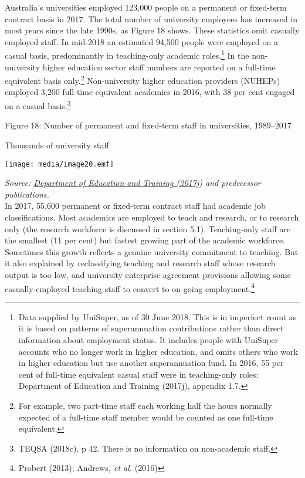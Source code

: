 \documentclass[]{book}
\begin{document}
Australia's universities employed 123,000 people on a permanent or fixed-term contract basis in 2017. The total number of university employees has increased in most years since the late 1990s, as Figure 18 shows. These statistics omit casually employed staff. In mid-2018 an estimated 94,500 people were employed on a casual basis, predominantly in teaching-only academic roles.\footnote{Data supplied by UniSuper, as of 30 June 2018. This is in imperfect count as it is based on patterns of superannuation contributions rather than direct information about employment status. It includes people with UniSuper accounts who no longer work in higher education, and omits others who work in higher education but use another superannuation fund. In 2016, 55 per cent of full-time equivalent casual staff were in teaching-only roles: Department of Education and Training (2017j), appendix 1.7.} In the non-university higher education sector staff numbers are reported on a full-time equivalent basis only.\footnote{For example, two part-time staff each working half the hours normally expected of a full-time staff member would be counted as one full-time equivalent.} Non-university higher education providers (NUHEPs) employed 3,200 full-time equivalent academics in 2016, with 38 per cent engaged on a casual basis.\footnote{TEQSA (2018c), p 42. There is no information on non-academic staff.}

\protect\hypertarget{_Ref395782462}{}{}Figure 18: Number of permanent and fixed-term staff in universities, 1989--2017

Thousands of university staff

\texttt{[image: media/image20.emf]}

\emph{Source: \protect\hyperlink{_ENREF_76}{Department of Education and Training (2017j}) and predecessor publications.}\\
In 2017, 55,600 permanent or fixed-term contract staff had academic job classifications. Most academics are employed to teach and research, or to research only (the research workforce is discussed in section 5.1). Teaching-only staff are the smallest (11 per cent) but fastest growing part of the academic workforce. Sometimes this growth reflects a genuine university commitment to teaching. But it also explained by reclassifying teaching and research staff whose research output is too low, and university enterprise agreement provisions allowing some casually-employed teaching staff to convert to on-going employment.\footnote{Probert (2013); Andrews\emph{, et al.} (2016)}
\end{document}
